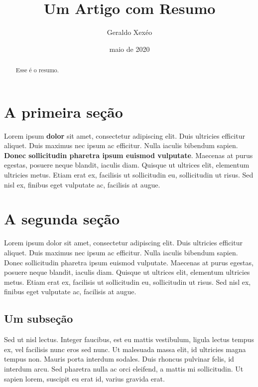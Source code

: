 \documentclass{article}
\title{Um Artigo com Resumo}
\author{Geraldo Xexéo}
\date{maio de 2020}
\begin{document}
\maketitle

\begin{abstract}
    Esse é o resumo.
\end{abstract}

\section{A primeira seção}

Lorem ipsum \textbf{dolor} sit amet, consectetur adipiscing elit. Duis ultricies efficitur aliquet. Duis maximus nec ipsum ac efficitur. Nulla iaculis bibendum sapien. \textbf{Donec sollicitudin pharetra ipsum euismod vulputate}. Maecenas at purus egestas, posuere neque blandit, iaculis diam. Quisque ut ultrices elit, elementum ultricies metus. Etiam erat ex, facilisis ut sollicitudin eu, sollicitudin ut risus. Sed nisl ex, finibus eget vulputate ac, facilisis at augue.

\section{A segunda seção}

Lorem ipsum dolor sit amet, consectetur adipiscing elit. Duis ultricies efficitur aliquet. Duis maximus nec ipsum ac efficitur. Nulla iaculis bibendum sapien. Donec sollicitudin pharetra ipsum euismod vulputate. Maecenas at purus egestas, posuere neque blandit, iaculis diam. Quisque ut ultrices elit, elementum ultricies metus. Etiam erat ex, facilisis ut sollicitudin eu, sollicitudin ut risus. Sed nisl ex, finibus eget vulputate ac, facilisis at augue.

\subsection{Um subseção}


Sed ut nisl lectus. Integer faucibus, est eu mattis vestibulum, ligula lectus tempus ex, vel facilisis nunc eros sed nunc. Ut malesuada massa elit, id ultricies magna tempus non. Mauris porta interdum sodales. Duis rhoncus pulvinar felis, id interdum arcu. Sed pharetra nulla ac orci eleifend, a mattis mi sollicitudin. Ut sapien lorem, suscipit eu erat id, varius gravida erat.
\end{document}
